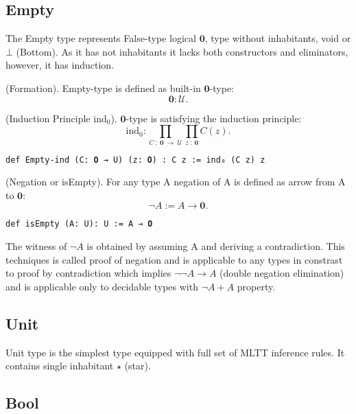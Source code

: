 \documentclass{article}
\begin{document}
\newpage
\subsection{Empty}

The Empty type represents False-type logical $\mathbf{0}$, type without inhabitants, void or $\bot$ (Bottom).
As it has not inhabitants it lacks both constructors and eliminators, however, it has induction.

\begin{definition} (Formation).
Empty-type is defined as built-in $\mathbf{0}$-type:
$$
 \mathbf{0} : \mathcal{U}.
$$
\end{definition}

\begin{theorem} (Induction Principle $\mathrm{ind_0}$).
$\mathbf{0}$-type is satisfying the induction principle:
$$
  \mathrm{ind_0} : \prod_{C\ :\ \mathbf{0}\ \rightarrow\ \mathcal{U}} \prod_{z\ :\ \mathbf{0}} C(z).
$$
\begin{lstlisting}
def Empty-ind (C: 𝟎 → U) (z: 𝟎) : C z := ind₀ (C z) z
\end{lstlisting}
\end{theorem}

\begin{definition} (Negation or isEmpty).
For any type A negation of A is defined as arrow from A to $\mathbf{0}$:
$$
  \neg A := A \rightarrow \mathbf{0}.
$$
\begin{lstlisting}
def isEmpty (A: U): U := A → 𝟎
\end{lstlisting}
\end{definition}

The witness of $\neg A$ is obtained by assuming A and deriving a contradiction.
This techniques is called proof of negation and is applicable to any types in constrast
to proof by contradiction which implies $\neg\neg A \rightarrow A$ (double negation elimination) and is
applicable only to decidable types with $\neg A + A$ property.

\newpage
\subsection{Unit}
Unit type is the simplest type equipped with full set of MLTT inference rules. It contains single inhabitant $\star$ (star).

\newpage
\subsection{Bool}
\end{document}
